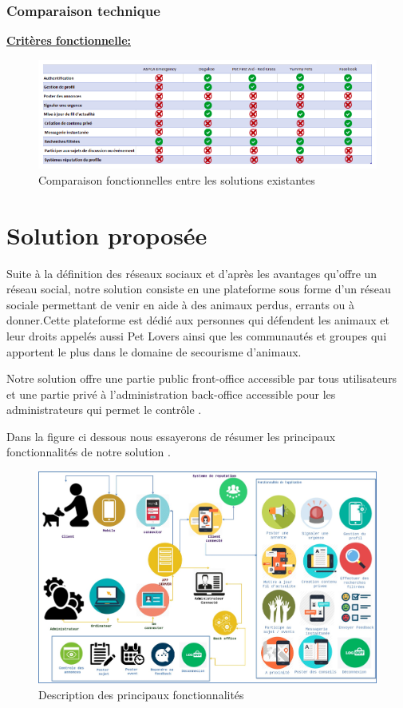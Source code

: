 \documentclass[11pt,a4paper,oneside]{book}
\begin{document}
	\subsubsection{Comparaison technique}
	\underline{\textbf{Critères fonctionnelle:}}
	
	\begin{figure}[H]
		\centering
		\includegraphics[width=1.3\textwidth]{Images/Ch1/comparaison-fonctionnelles}
		\caption{Comparaison fonctionnelles entre les solutions existantes}
		\label{fig:comparaison-fonctionnelles}
	\end{figure}
	
	
	
	\section{Solution proposée }
	Suite à la définition des réseaux sociaux et d'après les avantages qu’offre un réseau social, notre solution consiste en une plateforme sous forme d’un réseau sociale permettant de venir en aide à des animaux perdus, errants ou à donner.Cette plateforme est dédié aux personnes qui défendent les animaux et leur droits appelés aussi Pet Lovers ainsi que les communautés et groupes qui apportent le plus dans le domaine de secourisme d’animaux.
	
	Notre solution offre une partie public front-office accessible par tous utilisateurs et une partie privé à l’administration back-office accessible pour les administrateurs qui permet le contrôle .
	
	Dans la figure ci dessous nous essayerons de résumer les principaux fonctionnalités  de notre solution .
	\\
	\begin{figure}[H]
		\centering
		\includegraphics[width=1.3\textwidth]{Images/Ch1/objectives}
		\caption{Description des principaux fonctionnalités}
		\label{fig:objectives}
	\end{figure}
	
\end{document}
